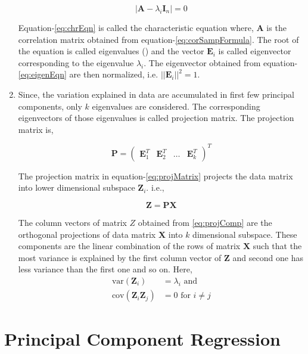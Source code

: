 \documentclass[12pt, lot, lof]{thesis}\usepackage[]{graphicx}\usepackage[]{color}
\newcommand{\mbf}[1]{\ensuremath{\mathbf{#1}}}
\begin{document}
\begin{enumerate}
  \begin{equation}
    |\mbf{A}-\lambda_i \mbf{I}_n|=0
    \label{eq:chrEqn}
  \end{equation}
  
Equation-\ref{eq:chrEqn} is called the characteristic equation where, $\mbf{A}$ is the correlation matrix obtained from equation-\ref{eq:corSampFormula}.  The root of the equation is called eigenvalues (\cite{seber2008matrix}) and the vector $\mbf{E}_i$ is called eigenvector corresponding to the eigenvalue $\lambda_i$. The eigenvector obtained from equation-\ref{eq:eigenEqn} are then normalized, i.e. $||\mbf{E}_i||^2=1$. 

\item Since, the variation explained in data are accumulated in first few  principal components, only $k$ eigenvalues are considered. The corresponding eigenvectors of those eigenvalues is called projection matrix. The projection matrix is,

\begin{equation}
  \mbf{P}=\begin{pmatrix} \mbf{E}_1^T & \mbf{E}_2^T & \ldots & \mbf{E}_k^T\end{pmatrix}^T
  \label{eq:projMatrix}
\end{equation}

The projection matrix in equation-\ref{eq:projMatrix} projects the data matrix into lower dimensional subspace $\mbf{Z}_i$. i.e.,

\begin{equation}
  \mbf{Z}=\mbf{PX}
  \label{eq:projComp}
\end{equation}

The column vectors of matrix $Z$ obtained from \ref{eq:projComp} are the orthogonal projections of data matrix $\mbf{X}$ into $k$ dimensional subspace. These components are the linear combination of the rows of matrix $\mbf{X}$ such that the most variance is explained by the first column vector of $\mbf{Z}$ and second one has less variance than the first one and so on. Here,
\begin{align*}
	\text{var}(\mbf{Z}_i)&=\lambda_i \text{ and }\\
	\text{cov}(\mbf{Z}_i\mbf{Z}_j)&=0\text{ for }i\ne j
\end{align*}
\end{enumerate}

\section{Principal Component Regression}
\label{sec:pcr}
\end{document}
